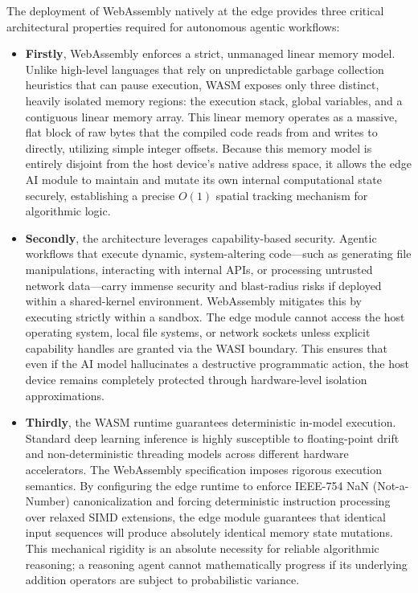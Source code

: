 \documentclass[11pt,a4paper]{article}
\begin{document}
The deployment of WebAssembly natively at the edge provides three critical architectural properties required for autonomous agentic workflows:

\begin{itemize}
    \item \textbf{Firstly}, WebAssembly enforces a strict, unmanaged linear memory model. Unlike high-level languages that rely on unpredictable garbage collection heuristics that can pause execution, WASM exposes only three distinct, heavily isolated memory regions: the execution stack, global variables, and a contiguous linear memory array. This linear memory operates as a massive, flat block of raw bytes that the compiled code reads from and writes to directly, utilizing simple integer offsets. Because this memory model is entirely disjoint from the host device's native address space, it allows the edge AI module to maintain and mutate its own internal computational state securely, establishing a precise $O(1)$ spatial tracking mechanism for algorithmic logic.
    \item \textbf{Secondly}, the architecture leverages capability-based security. Agentic workflows that execute dynamic, system-altering code---such as generating file manipulations, interacting with internal APIs, or processing untrusted network data---carry immense security and blast-radius risks if deployed within a shared-kernel environment. WebAssembly mitigates this by executing strictly within a sandbox. The edge module cannot access the host operating system, local file systems, or network sockets unless explicit capability handles are granted via the WASI boundary. This ensures that even if the AI model hallucinates a destructive programmatic action, the host device remains completely protected through hardware-level isolation approximations.
    \item \textbf{Thirdly}, the WASM runtime guarantees deterministic in-model execution. Standard deep learning inference is highly susceptible to floating-point drift and non-deterministic threading models across different hardware accelerators. The WebAssembly specification imposes rigorous execution semantics. By configuring the edge runtime to enforce IEEE-754 NaN (Not-a-Number) canonicalization and forcing deterministic instruction processing over relaxed SIMD extensions, the edge module guarantees that identical input sequences will produce absolutely identical memory state mutations. This mechanical rigidity is an absolute necessity for reliable algorithmic reasoning; a reasoning agent cannot mathematically progress if its underlying addition operators are subject to probabilistic variance.
\end{itemize}
\end{document}
